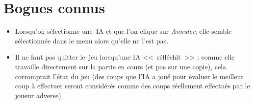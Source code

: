 \section{Bogues connus}
\begin{itemize}

	\item Lorsqu'on sélectionne une~IA et que l'on clique sur \textit{Annuler}, 
            elle semble sélectionnée dans le menu alors qu'elle ne l'est pas.
            
    \item Il ne faut pas quitter le~jeu lorsqu'une IA <<~réfléchit~>> : comme elle travaille 
            directement sur la partie en cours (et pas sur une copie), cela corromprait l'état du jeu 
            (des coups que l'IA a joué pour évaluer le meilleur coup à effectuer seront considérés 
            comme des coups réellement effectués par le joueur adverse).
    
\end{itemize}